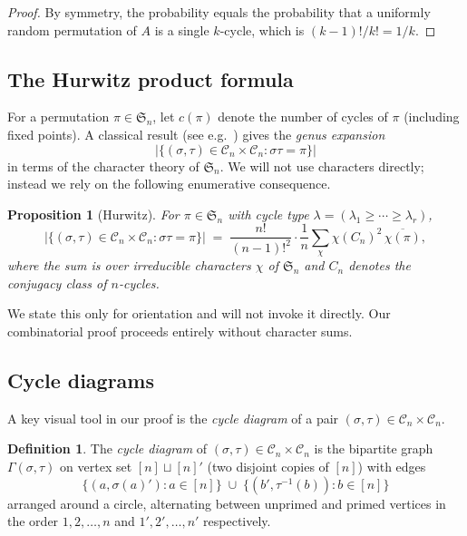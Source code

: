 \documentclass[12pt,a4paper]{article}
\newtheorem{proposition}[theorem]{Proposition}
\theoremstyle{definition}
\newtheorem{definition}[theorem]{Definition}
\newcommand{\Sn}{\mathfrak{S}_n}
\newcommand{\Cn}{\mathcal{C}_n}
\newcommand{\abs}[1]{\lvert #1 \rvert}
\begin{document}
\begin{proof}
By symmetry, the probability equals the probability that a uniformly
random permutation of $A$ is a single $k$-cycle, which is
$(k-1)!/k! = 1/k$.
\end{proof}

\subsection{The Hurwitz product formula}

For a permutation $\pi\in\Sn$, let $c(\pi)$ denote the number of cycles
of $\pi$ (including fixed points).  A classical result
(see e.g.\ \cite{Stanley2001}) gives the \emph{genus expansion}
\[
\abs{\bigl\{(\sigma,\tau)\in\Cn\times\Cn : \sigma\tau = \pi\bigr\}}
\]
in terms of the character theory of $\Sn$.  We will not use characters
directly; instead we rely on the following enumerative consequence.

\begin{proposition}[Hurwitz]
\label{prop:hurwitz}
For $\pi\in\Sn$ with cycle type $\lambda=(\lambda_1\ge\cdots\ge\lambda_r)$,
\[
\abs{\bigl\{(\sigma,\tau)\in\Cn\times\Cn : \sigma\tau=\pi\bigr\}}
\;=\;
\frac{n!}{(n-1)!^2}
\cdot
\frac{1}{n}
\sum_{\chi} \chi(C_n)^2 \,\overline{\chi(\pi)},
\]
where the sum is over irreducible characters $\chi$ of $\Sn$ and $C_n$
denotes the conjugacy class of $n$-cycles.
\end{proposition}

We state this only for orientation and will not invoke it directly.
Our combinatorial proof proceeds entirely without character sums.

\subsection{Cycle diagrams}

A key visual tool in our proof is the \emph{cycle diagram} of a pair
$(\sigma,\tau)\in\Cn\times\Cn$.

\begin{definition}
\label{def:cycle_diagram}
The \emph{cycle diagram} of $(\sigma,\tau)\in\Cn\times\Cn$ is the
bipartite graph $\Gamma(\sigma,\tau)$ on vertex set
$[n]\sqcup[n]'$ (two disjoint copies of $[n]$) with edges
\[
\bigl\{(a,\sigma(a)') : a\in[n]\bigr\}
\;\cup\;
\bigl\{(b',\tau^{-1}(b)) : b\in[n]\bigr\}
\]
arranged around a circle, alternating between unprimed and primed
vertices in the order $1,2,\dots,n$ and $1',2',\dots,n'$
respectively.
\end{definition}
\end{document}
